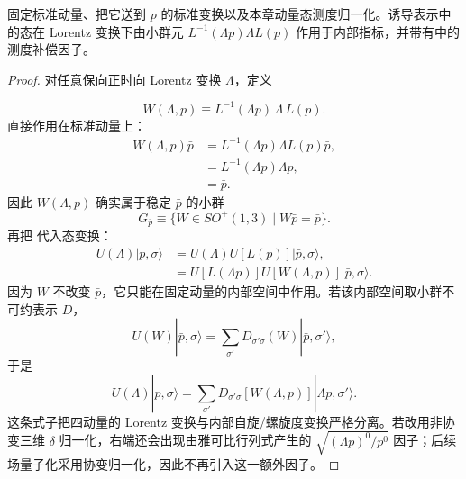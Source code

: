\begin{proposition}
固定标准动量、把它送到 $p$ 的标准变换以及本章动量态测度归一化。诱导表示中的态在 Lorentz 变换下由小群元 $L^{-1}(\Lambda p)\Lambda L(p)$ 作用于内部指标，并带有中的测度补偿因子。
\end{proposition}
\begin{proof}
对任意保向正时向 Lorentz 变换 $\Lambda$，定义

\begin{equation*}
 {
 W(\Lambda,p)
 \equiv L^{-1}(\Lambda p)\,\Lambda\,L(p).}
 \end{equation*}
直接作用在标准动量上：
\begin{align*}
 W(\Lambda,p)\bar p
 &=L^{-1}(\Lambda p)\Lambda L(p)\bar p,\\
 &=L^{-1}(\Lambda p)\Lambda p,\\
 &=\bar p.
 \end{align*}
因此 $W(\Lambda,p)$ 确实属于稳定 $\bar p$ 的小群
\begin{equation*}
 G_{\bar p}\equiv\{W\in SO^+(1,3)\mid W\bar p=\bar p\}.
 \end{equation*}
再把  代入态变换：
\begin{align*}
 U(\Lambda)|p,\sigma\rangle
 &=U(\Lambda)U[L(p)]|\bar p,\sigma\rangle,\\
 &=U[L(\Lambda p)]U[W(\Lambda,p)]|\bar p,\sigma\rangle.
\end{align*}
因为 $W$ 不改变 $\bar p$，它只能在固定动量的内部空间中作用。若该内部空间取小群不可约表示 $D$，
\begin{equation*}
 U(W)|\bar p,\sigma\rangle
 =\sum_{\sigma'}D_{\sigma'\sigma}(W)|\bar p,\sigma'\rangle,
\end{equation*}
于是
\begin{equation*}
 {
 U(\Lambda)|p,\sigma\rangle
 =\sum_{\sigma'}
 D_{\sigma'\sigma}[W(\Lambda,p)]
 |\Lambda p,\sigma'\rangle.}
 \end{equation*}
这条式子把四动量的 Lorentz 变换与内部自旋/螺旋度变换严格分离。若改用非协变三维 $\delta$ 归一化，右端还会出现由雅可比行列式产生的 $\sqrt{(\Lambda p)^0/p^0}$ 因子；后续场量子化采用协变归一化，因此不再引入这一额外因子。
\end{proof}

